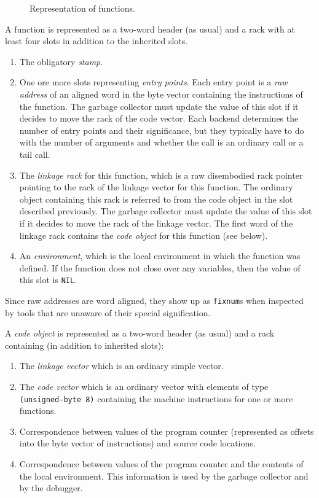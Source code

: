 \begin{figure}
\begin{center}
\end{center}
\caption{\label{fig-function-representation}
Representation of functions.}
\end{figure}

A function is represented as a two-word header (as usual) and a
rack with at least four slots in addition to the inherited
slots.

\begin{enumerate}
\item The obligatory \emph{stamp}.
\item One ore more slots representing \emph{entry points}.  Each entry
  point is a \emph{raw address} of an aligned word in the byte vector
  containing the instructions of the function.  The garbage collector
  must update the value of this slot if it decides to move the
  rack of the code vector.  Each backend determines the number
  of entry points and their significance, but they typically have to
  do with the number of arguments and whether the call is an ordinary
  call or a tail call.
\item The \emph{linkage rack} for this function, which is a raw
  disembodied rack pointer pointing to the rack
  of the linkage vector for this function.  The ordinary \cl{}
  object containing this rack is referred to from the code
  object in the slot described previously.  The garbage collector must
  update the value of this slot if it decides to move the rack
  of the linkage vector.  The first word of the linkage
  rack contains the \emph{code object} for this function (see below).
\item An \emph{environment}, which is the local environment in which
  the function was defined. If the function does not close over any
  variables, then the value of this slot is \texttt{NIL}.
\end{enumerate}

Since raw addresses are word aligned, they show up as \texttt{fixnum}s
when inspected by tools that are unaware of their special
signification.  

A \emph{code object} is represented as a two-word header (as usual)
and a rack containing (in addition to inherited slots):

\begin{enumerate}
\item The \emph{linkage vector} which is an ordinary \cl{} simple
  vector.
\item The \emph{code vector} which is an ordinary \cl{} vector with
  elements of type \texttt{(unsigned-byte 8)} containing the machine
  instructions for one or more functions.
\item Correspondence between values of the program counter
  (represented as offsets into the byte vector of instructions) and
  source code locations.  
\item Correspondence between values of the program counter and the
  contents of the local environment.  This information is used by the
  garbage collector and by the debugger. 
\end{enumerate}

